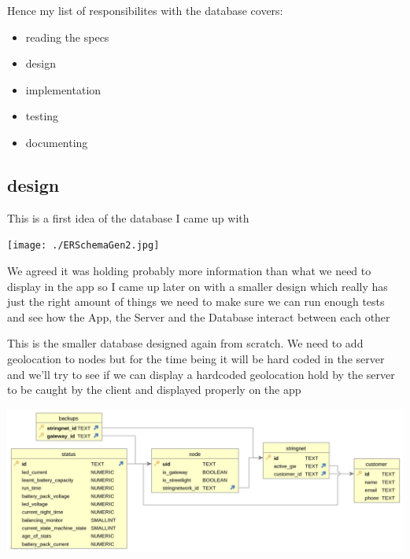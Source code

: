 \documentclass[a4paper,12pt]{article}
\begin{document}
Hence my list of responsibilites with the database covers:

\begin{itemize}
\item {reading the specs}
\item design
\item implementation
\item testing 
\item documenting
\end{itemize}

\clearpage

\subsection{design}
This is a first idea of the database I came up with

\noindent\texttt{[image: ./ERSchemaGen2.jpg]}

We agreed it was holding probably more information than what we need to display in the app so I came up later on with a smaller design which really has just the right amount of things we need to make sure we can run enough tests and see how the App, the Server and the Database interact between each other
\clearpage

This is the smaller database designed again from scratch. We need to add geolocation to nodes but for the time being it will be hard coded in the server and we'll try to see if we can display a hardcoded geolocation hold by the server to be caught by the client and displayed properly on the app

\noindent\includegraphics[width=14cm]{./SecondERSchemaGen2.jpg}

\printindex
\end{document}
